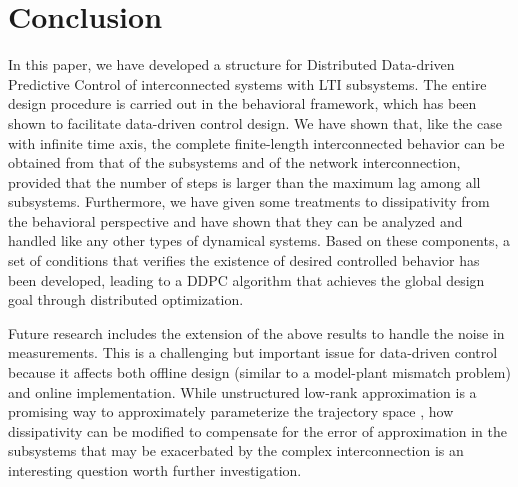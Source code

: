 \documentclass[11pt,print,draftcls,onecolumn,romanappendices]{ieeecolor}
\newcommand{\revise}[1]{{\color{black} #1}}
\begin{document}
\section{Conclusion}\label{sec:conclusion}
In this paper, we have developed a structure for Distributed Data-driven Predictive Control of interconnected systems with LTI subsystems. The entire design procedure is carried out in the behavioral framework, which has been shown to facilitate data-driven control design. We have shown that, like the case with infinite time axis, the complete finite-length interconnected behavior can be obtained from that of the subsystems and of the network interconnection, provided that the number of steps is larger than the maximum lag among all subsystems. Furthermore, we have given some treatments to dissipativity from the behavioral perspective and have shown that they can be analyzed and handled like any other types of dynamical systems. \revise{Based on these components, a set of conditions that verifies the existence of desired controlled behavior has been developed, leading to a DDPC algorithm that achieves the global design goal through distributed optimization.}

Future research includes the extension of the above results to handle the noise in measurements. This is a challenging but important issue for data-driven control because it affects both offline design (similar to a model-plant mismatch problem) and online implementation. While unstructured low-rank approximation is a promising way to approximately parameterize the trajectory space \cite{Markovsky:2012}, how dissipativity can be modified to compensate for the error of approximation in the subsystems that may be exacerbated by the complex interconnection is an interesting question worth further investigation.
\end{document}
